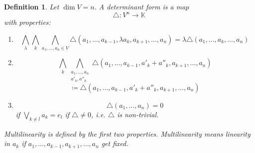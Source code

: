 \documentclass[a4paper,landscape,twocolumn]{article}
\newtheorem{defi}{Definition}
\begin{document}
\begin{defi}
  Let $\dim{V} = n$. A \emph{determinant form} is a map
  \[ \triangle: V^n \to \mathbb K \]
  with properties:
  \begin{enumerate}
    \item
      \[
        \bigwedge_{\lambda} \bigwedge_{k} \bigwedge_{a_1,\ldots,a_n \in V}
        \triangle (a_1, \ldots, a_{k-1}, \lambda a_k, a_{k+1}, \ldots, a_n)
        = \lambda \triangle (a_1, \ldots, a_k, \ldots, a_n)
      \]
    \item
      \[
        \bigwedge_k \bigwedge_{\substack{a_1, \ldots, a_n \\ a'_k, a''_k}}
        \triangle(a_1, \ldots, a_{k-1}, a'_k + a''_k, a_{k+1}, \ldots, a_n)
      \] \[
        \coloneqq \triangle(a_1, \ldots, a_{k-1}, a'_k + a''_k, a_{k+1}, \ldots, a_n)
      \]
    \item
      \[ \triangle(a_1, \ldots, a_n) = 0 \]
      if $\bigvee_{k \neq l} a_k = e_l$
      if $\triangle \neq 0$, i.e. $\triangle$ is non-trivial.
  \end{enumerate}
  Multilinearity is defined by the first two properties.
  Multilinearity means linearity in $a_k$ if $a_1, \ldots, a_{k-1}, a_{k+1}, \ldots, a_n$
  get fixed.
\end{defi}
\end{document}
